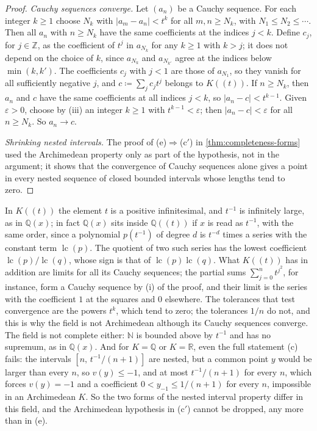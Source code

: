 \begin{proof}
\emph{Cauchy sequences converge.} Let $(a_n)$ be a Cauchy sequence. For each integer $k\ge1$ choose $N_k$ with $|a_m-a_n|<t^k$ for all $m,n\ge N_k$, with $N_1\le N_2\le\cdots$. Then all $a_n$ with $n\ge N_k$ have the same coefficients at the indices $j<k$. Define $c_j$, for $j\in\mathbb Z$, as the coefficient of $t^j$ in $a_{N_k}$ for any $k\ge1$ with $k>j$; it does not depend on the choice of $k$, since $a_{N_k}$ and $a_{N_{k'}}$ agree at the indices below $\min(k,k')$. The coefficients $c_j$ with $j<1$ are those of $a_{N_1}$, so they vanish for all sufficiently negative $j$, and $c\coloneqq\sum_jc_jt^j$ belongs to $K((t))$. If $n\ge N_k$, then $a_n$ and $c$ have the same coefficients at all indices $j<k$, so $|a_n-c|<t^{k-1}$. Given $\varepsilon>0$, choose by (iii) an integer $k\ge1$ with $t^{k-1}<\varepsilon$; then $|a_n-c|<\varepsilon$ for all $n\ge N_k$. So $a_n\to c$.

\emph{Shrinking nested intervals.} The proof of (e)$\Rightarrow$(c$'$) in \cref{thm:completeness-forms} used the Archimedean property only as part of the hypothesis, not in the argument; it shows that the convergence of Cauchy sequences alone gives a point in every nested sequence of closed bounded intervals whose lengths tend to zero.
\end{proof}

In $K((t))$ the element $t$ is a positive infinitesimal, and $t^{-1}$ is infinitely large, as in $\mathbb Q(x)$; in fact $\mathbb Q(x)$ sits inside $\mathbb Q((t))$ if $x$ is read as $t^{-1}$, with the same order, since a polynomial $p(t^{-1})$ of degree $d$ is $t^{-d}$ times a series with the constant term $\operatorname{lc}(p)$. The quotient of two such series has the lowest coefficient $\operatorname{lc}(p)/\operatorname{lc}(q)$, whose sign is that of $\operatorname{lc}(p)\operatorname{lc}(q)$. What $K((t))$ has in addition are limits for all its Cauchy sequences; the partial sums $\sum_{j=0}^nt^{j^2}$, for instance, form a Cauchy sequence by (i) of the proof, and their limit is the series with the coefficient $1$ at the squares and $0$ elsewhere. The tolerances that test convergence are the powers $t^k$, which tend to zero; the tolerances $1/n$ do not, and this is why the field is not Archimedean although its Cauchy sequences converge. The field is not complete either: $\mathbb N$ is bounded above by $t^{-1}$ and has no supremum, as in $\mathbb Q(x)$. And for $K=\mathbb Q$ or $K=\mathbb R$, even the full statement (c) fails: the intervals $[n,\,t^{-1}/(n+1)]$ are nested, but a common point $y$ would be larger than every $n$, so $v(y)\le-1$, and at most $t^{-1}/(n+1)$ for every $n$, which forces $v(y)=-1$ and a coefficient $0<y_{-1}\le1/(n+1)$ for every $n$, impossible in an Archimedean $K$. So the two forms of the nested interval property differ in this field, and the Archimedean hypothesis in (c$'$) cannot be dropped, any more than in (e).


